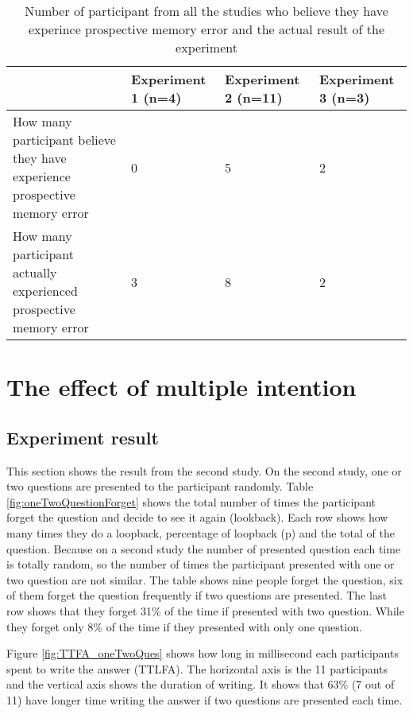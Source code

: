\begin{table}[]
\centering
\small
\footnotesize
\begin{tabu}{|X[6,l]|X[2,c]|X[2,c]|X[2,c]|}
\hline
                                                                           & Experiment 1 (n=4) & Experiment 2 (n=11) & Experiment 3 (n=3) \\ \hline
How many participant believe they have experience prospective memory error & 0                  & 5                   & 2                  \\ \hline
How many participant actually experienced prospective memory error          & 3                  & 8                   & 2                  \\ \hline
\end{tabu}
\caption{Number of participant from all the studies who believe they have experince prospective memory error and the actual result of the experiment}
\label{fig:affirmationTable}
\end{table}



\section{The effect of multiple intention}

\subsection{Experiment result}
This section shows the result from the second study. On the second study, one or two questions are presented to the participant randomly.
Table \ref{fig:oneTwoQuestionForget} shows the total number of times the participant forget the question and decide to see it again (lookback).
Each row shows how many times they do a loopback, percentage of loopback (p) and the total of the question.
Because on a second study the number of presented question each time is totally random, so the number of times the participant presented with
one or two question are not similar.
The table shows nine people forget the question, six of them forget the question frequently if two questions are presented.
The last row shows that they forget 31\% of the time if presented with two question.
While they forget only 8\% of the time if they presented with only one question.

Figure \ref{fig:TTFA_oneTwoQues} shows how long in millisecond each participants spent to write the answer (TTLFA).
The horizontal axis is the 11 participants and the vertical axis shows the duration of writing.
 It shows that 63\% (7 out of 11) have longer time writing the answer if two questions are presented each time.

